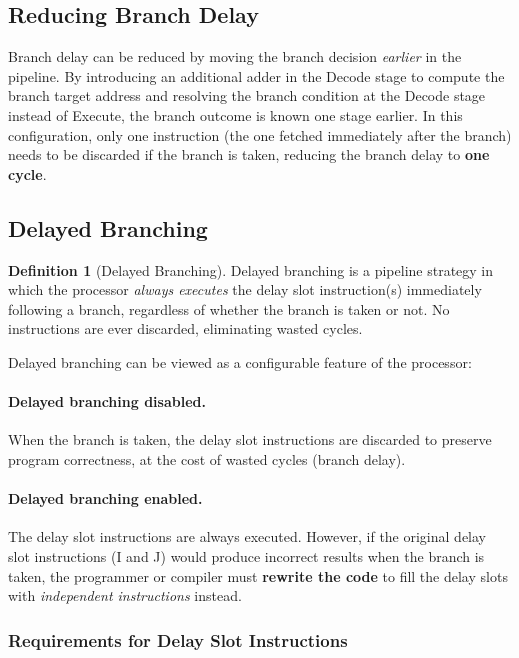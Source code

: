 \documentclass[11pt, a4paper, notitlepage]{report}
\theoremstyle{definition}
\newtheorem{definition}[theorem]{Definition}
\theoremstyle{remark}
\theoremstyle{definition}
\begin{document}
\subsection{Reducing Branch Delay}
\label{sec:reduce-branch-delay}

Branch delay can be reduced by moving the branch decision \emph{earlier} in the pipeline. By introducing an additional adder in the Decode stage to compute the branch target address and resolving the branch condition at the Decode stage instead of Execute, the branch outcome is known one stage earlier. In this configuration, only one instruction (the one fetched immediately after the branch) needs to be discarded if the branch is taken, reducing the branch delay to \textbf{one cycle}.

\subsection{Delayed Branching}
\label{sec:delayed-branching}

\begin{definition}[Delayed Branching]
\label{def:delayed-branching}
  Delayed branching is a pipeline strategy in which the processor \emph{always executes} the delay slot instruction(s) immediately following a branch, regardless of whether the branch is taken or not. No instructions are ever discarded, eliminating wasted cycles.
\end{definition}

Delayed branching can be viewed as a configurable feature of the processor:

\paragraph{Delayed branching disabled.} When the branch is taken, the delay slot instructions are discarded to preserve program correctness, at the cost of wasted cycles (branch delay).

\paragraph{Delayed branching enabled.} The delay slot instructions are always executed. However, if the original delay slot instructions (I and J) would produce incorrect results when the branch is taken, the programmer or compiler must \textbf{rewrite the code} to fill the delay slots with \emph{independent instructions} instead.

\subsubsection{Requirements for Delay Slot Instructions}
\label{sec:delay-slot-requirements}
\end{document}
